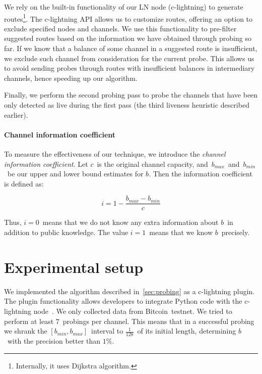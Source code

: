 We rely on the built-in functionality of our LN node (c-lightning) to generate routes\footnote{Internally, it uses Dijkstra algorithm.}.
The c-lightning API allows us to customize routes, offering an option to exclude specified nodes and channels.
We use this functionality to pre-filter suggested routes based on the information we have obtained through probing so far.
If we know that a balance of some channel in a suggested route is insufficient, we exclude such channel from consideration for the current probe.
This allows us to avoid sending probes through routes with insufficient balances in intermediary channels, hence speeding up our algorithm.

Finally, we perform the second probing pass to probe the channels that have been only detected as live during the first pass (the third liveness heuristic described earlier).

\paragraph{Channel information coefficient}
To measure the effectiveness of our technique, we introduce the \textit{channel information coefficient}.
Let $c$~is the original channel capacity, and~$b_{max}$~and~$b_{min}$~be our upper and lower bound estimates for $b$.
Then the information coefficient is defined as:

\[i = 1 - \frac{b_{max} - b_{min}}{c}\]

Thus, $i = 0$~means that we do not know any extra information about $b$~in addition to public knowledge.
The value $i = 1$~means that we know $b$~precisely.


\section{Experimental setup}

We implemented the algorithm described in~\cref{sec:probing} as a c-lightning plugin.
The plugin functionality allows developers to integrate Python code with the c-lightning node~\cite{clightningPlugins}.
We only collected data from Bitcoin~testnet.
We tried to perform at least $7$~probings per channel.
This means that in a successful probing we shrank the $[b_{min}, b_{max}]$~interval to $\frac{1}{128}$~of its initial length, determining $b$~with the precision better than $1\%$.

